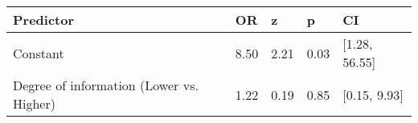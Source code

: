 \begin{tabular}{lllll}
  \toprule
Predictor & OR & z & p & CI \\ 
  \midrule
Constant & 8.50 & 2.21 & 0.03 & [1.28, 56.55] \\ 
  Degree of information (Lower vs. Higher) & 1.22 & 0.19 & 0.85 & [0.15, 9.93] \\ 
   \bottomrule
\end{tabular}
